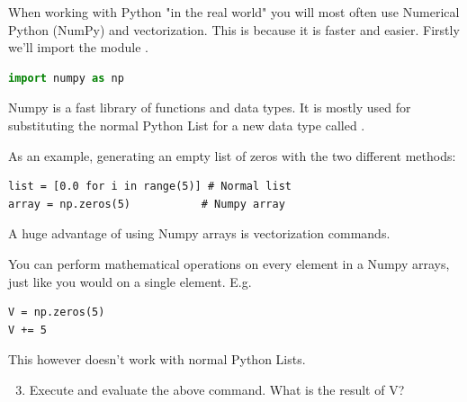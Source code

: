 \documentclass{article}
\begin{document}

When working with Python "in the real world" you will most often use Numerical
Python (NumPy) and vectorization.
This is because it is faster and easier.
Firstly we'll import the module .


\begin{lstlisting}[language=python]
import numpy as np
\end{lstlisting}

Numpy is a fast library of functions and data types.
It is mostly used for substituting the normal Python List for a new data type
called .

As an example, generating an empty list of zeros with the two different methods:

\begin{lstlisting}
list = [0.0 for i in range(5)] # Normal list
array = np.zeros(5)           # Numpy array
\end{lstlisting}

A huge advantage of using Numpy arrays is vectorization commands.
%
%
%
%

You can perform mathematical operations on every element in a Numpy arrays, just like you would on a single element. E.g. 
\begin{lstlisting}
V = np.zeros(5)
V += 5
\end{lstlisting}

This however doesn't work with normal Python Lists.

\begin{enumerate}
    \setcounter{enumi}{2}
    \item Execute and evaluate the above command. What is the result of V?
\end{enumerate}
\end{document}
